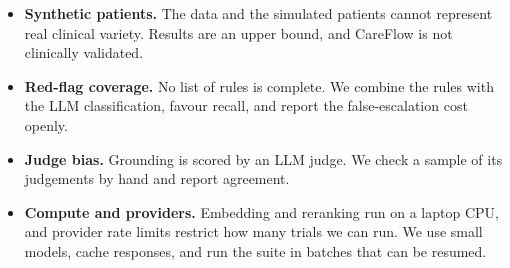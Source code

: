 \documentclass[11pt,a4paper]{article}
\begin{document}
\begin{itemize}
    \item \textbf{Synthetic patients.} The data and the simulated patients cannot represent real clinical variety. Results are an upper bound, and CareFlow is not clinically validated.
    \item \textbf{Red-flag coverage.} No list of rules is complete. We combine the rules with the LLM classification, favour recall, and report the false-escalation cost openly.
    \item \textbf{Judge bias.} Grounding is scored by an LLM judge. We check a sample of its judgements by hand and report agreement.
    \item \textbf{Compute and providers.} Embedding and reranking run on a laptop CPU, and provider rate limits restrict how many trials we can run. We use small models, cache responses, and run the suite in batches that can be resumed.
\end{itemize}
\end{document}
